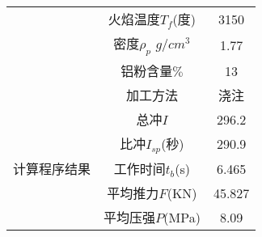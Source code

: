\begin{longtable}{c|c|c}
   & 火焰温度$T_{f}$(度)& 3150\\ \cline{2-3}
   & 密度$\rho_{p}$ $g/cm^3$& 1.77\\ \cline{2-3}
   & 铝粉含量\(\%\)& 13\\ \cline{2-3}
   & 加工方法 & 浇注\\ \hline
   & 总冲$I$& 296.2\\ \cline{2-3}
   & 比冲$I_{sp}$(秒)& 290.9\\
   计算程序结果& 工作时间$t_{b}$(s)& 6.465\\ \cline{2-3}
   & 平均推力$F$(KN)& 45.827\\ \cline{2-3}
   & 平均压强$P$(MPa)&  8.09\\
\end{longtable}